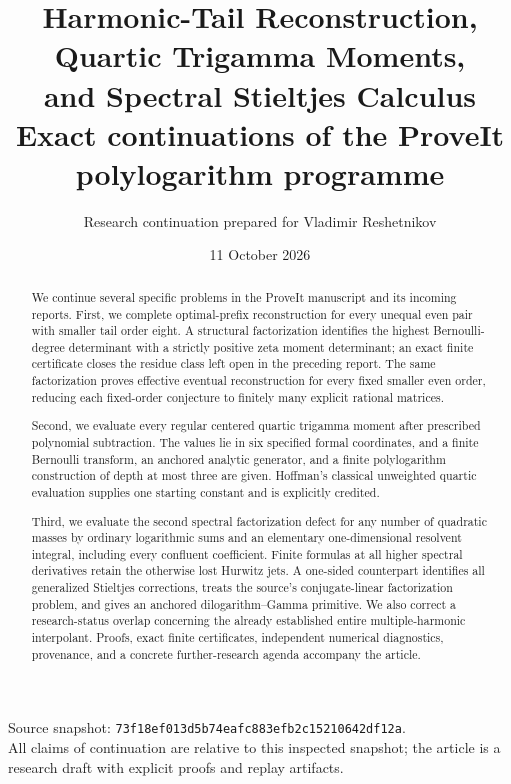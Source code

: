 \documentclass[11pt,a4paper]{article}
\title{\textbf{Harmonic-Tail Reconstruction,\\
Quartic Trigamma Moments,\\and Spectral Stieltjes Calculus}\\[8pt]
\large Exact continuations of the ProveIt polylogarithm programme}
\author{Research continuation prepared for Vladimir Reshetnikov}
\date{11 October 2026}
\numberwithin{equation}{section}
\theoremstyle{plain}
\theoremstyle{definition}
\theoremstyle{remark}
\newcommand{\sourcepin}{\texttt{73f18ef013d5b74eafc883efb2c15210642df12a}}
\begin{document}
\maketitle
\begin{abstract}
We continue several specific problems in the ProveIt manuscript and its
incoming reports.  First, we complete optimal-prefix reconstruction for
every unequal even pair with smaller tail order eight.  A structural
factorization identifies the highest Bernoulli-degree determinant with a
strictly positive zeta moment determinant; an exact finite certificate
closes the residue class left open in the preceding report.  The same
factorization proves effective eventual reconstruction for every fixed
smaller even order, reducing each fixed-order conjecture to finitely many
explicit rational matrices.

Second, we evaluate every regular centered quartic trigamma moment after
prescribed polynomial subtraction.  The values lie in six specified
formal coordinates, and a finite Bernoulli transform, an anchored analytic
generator, and a finite polylogarithm construction of depth at most three
are given.  Hoffman's classical unweighted quartic evaluation supplies
one starting constant and is explicitly credited.

Third, we evaluate the second spectral factorization defect for any
number of quadratic masses by ordinary logarithmic sums and an elementary
one-dimensional resolvent integral, including every confluent coefficient.
Finite formulas at all higher spectral derivatives retain the otherwise
lost Hurwitz jets.  A one-sided counterpart identifies all generalized
Stieltjes corrections, treats the source's conjugate-linear factorization
problem, and gives an anchored dilogarithm--Gamma primitive.
We also correct a research-status overlap concerning the already
established entire multiple-harmonic interpolant.  Proofs, exact finite
certificates, independent numerical diagnostics, provenance, and a
concrete further-research agenda accompany the article.
\end{abstract}
\begin{center}
\small Source snapshot: \sourcepin.\\
All claims of continuation are relative to this inspected snapshot;
the article is a research draft with explicit proofs and replay artifacts.
\end{center}
\clearpage
\begingroup\small
\tableofcontents
\endgroup
\clearpage

\end{document}
